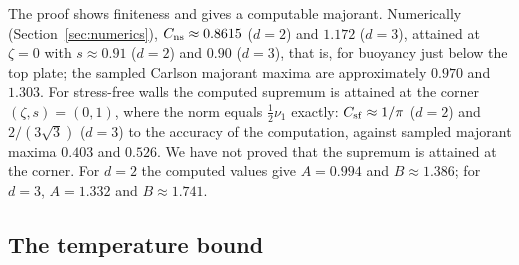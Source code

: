 The proof shows finiteness and gives a computable majorant. Numerically (Section~\ref{sec:numerics}),
$C_{\rm ns}\approx0.8615$ ($d=2$) and $1.172$ ($d=3$), attained at $\zeta=0$ with $s\approx0.91$ ($d=2$) and $0.90$
($d=3$), that is, for buoyancy just below the top plate; the sampled Carlson majorant maxima are approximately $0.970$ and $1.303$. For
stress-free walls the computed supremum is attained at the corner $(\zeta,s)=(0,1)$, where the norm equals
$\frac12\nu_1$ exactly: $C_{\rm sf}\approx1/\pi$ ($d=2$) and $2/(3\sqrt3)$ ($d=3$) to the accuracy of the
computation, against sampled majorant maxima $0.403$ and $0.526$. We have not proved that the supremum is attained at the corner.
For $d=2$ the computed values give $A=0.994$ and $B\approx1.386$; for $d=3$, $A=1.332$ and $B\approx1.741$.

\subsection{The temperature bound}

